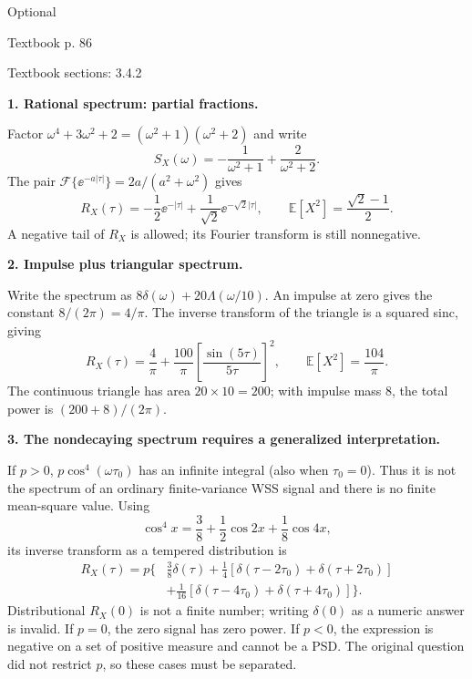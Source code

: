 \documentclass[11pt]{article}
\newcommand{\E}{\mathbb E}\newcommand{\Var}{\operatorname{Var}}\newcommand{\Cov}{\operatorname{Cov}}
\newcommand{\problem}[3]{\par\addvspace{1em}\Needspace{8\baselineskip}{\LARGE\bfseries Exercise #1}\hfill #2\par{\small\color{gray}Textbook p. #3}\par\vspace{3mm}}
\newcommand{\step}[1]{\par\Needspace{6\baselineskip}\textbf{#1}\par}
\begin{document}
\problem{3.19}{Optional}{86}
{\small Textbook sections: 3.4.2}
\step{1. Rational spectrum: partial fractions.}
Factor $\omega^4+3\omega^2+2=(\omega^2+1)(\omega^2+2)$ and write
\[S_X(\omega)=-\frac1{\omega^2+1}+\frac2{\omega^2+2}.\]
The pair $\mathcal F\{\ee^{-a|\tau|}\}=2a/(a^2+\omega^2)$ gives
\[\boxed{R_X(\tau)=-\frac12\ee^{-|\tau|}+\frac1{\sqrt2}\ee^{-\sqrt2|\tau|}},
\qquad\boxed{\E[X^2]=\frac{\sqrt2-1}{2}}.\]
A negative tail of $R_X$ is allowed; its Fourier transform is still nonnegative.
\step{2. Impulse plus triangular spectrum.}
Write the spectrum as $8\delta(\omega)+20\Lambda(\omega/10)$. An impulse at zero gives the constant $8/(2\pi)=4/\pi$. The inverse transform of the triangle is a squared sinc, giving
\[\boxed{R_X(\tau)=\frac4\pi+\frac{100}\pi\left[\frac{\sin(5\tau)}{5\tau}\right]^2},
\qquad\boxed{\E[X^2]=\frac{104}\pi}.\]
The continuous triangle has area $20\times10=200$; with impulse mass $8$, the total power is $(200+8)/(2\pi)$.
\step{3. The nondecaying spectrum requires a generalized interpretation.}
If $p>0$, $p\cos^4(\omega\tau_0)$ has an infinite integral (also when $\tau_0=0$). Thus it is not the spectrum of an ordinary finite-variance WSS signal and there is no finite mean-square value. Using
\[\cos^4x=\frac38+\frac12\cos2x+\frac18\cos4x,\]
its inverse transform as a tempered distribution is
\[\boxed{\begin{aligned}
R_X(\tau)=p\bigl\{&\tfrac38\delta(\tau)
+\tfrac14[\delta(\tau-2\tau_0)+\delta(\tau+2\tau_0)]\\
&+\tfrac1{16}[\delta(\tau-4\tau_0)+\delta(\tau+4\tau_0)]\bigr\}.
\end{aligned}}\]
Distributional $R_X(0)$ is not a finite number; writing $\delta(0)$ as a numeric answer is invalid. If $p=0$, the zero signal has zero power. If $p<0$, the expression is negative on a set of positive measure and cannot be a PSD. The original question did not restrict $p$, so these cases must be separated.
\end{document}
